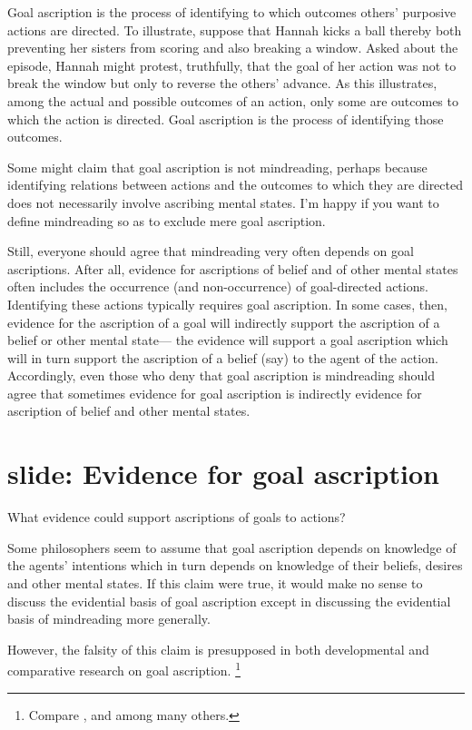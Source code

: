 \documentclass[12pt,\papersize]{extarticle}
\begin{document}
Goal ascription is the process of identifying to which outcomes others' purposive actions are directed.
To illustrate, suppose that
Hannah kicks a ball thereby both preventing her sisters from scoring and also breaking a window.
Asked about the episode,
Hannah might protest, truthfully, that the goal of her action was not to break the window but only to reverse the others' advance.
As this illustrates,
among the actual and possible outcomes of an action,
only some are outcomes to which the action is directed.
Goal ascription is the process of identifying 
 those outcomes.


Some might claim that goal ascription is not mindreading, perhaps because 
identifying relations between actions and the outcomes to which they are directed
does not necessarily involve ascribing mental states.
I'm happy if you want to define mindreading so as to exclude mere goal ascription.

Still, everyone should agree that mindreading very often depends on goal ascriptions. 
After all,
evidence for ascriptions of belief and of other mental states often includes the occurrence (and non-occurrence) of goal-directed actions.
Identifying these actions typically requires goal ascription.
In some cases, then, 
evidence for the ascription of a goal
will indirectly support the ascription of a belief or other mental state---%
the evidence will support  a goal ascription which will in turn support the ascription of a belief (say) to the agent of the action.
Accordingly, even those who deny that goal ascription is mindreading should agree that sometimes evidence for goal ascription is indirectly evidence for ascription of belief and other mental states.



\section{slide: Evidence for goal ascription}
What evidence could support ascriptions of goals to actions?

Some philosophers seem to assume that goal ascription depends on knowledge of the agents' intentions
which in turn depends 
on knowledge of their beliefs, desires and other mental states.
If this claim were true,
it would make no sense to discuss the evidential basis of goal ascription except in discussing the evidential basis of mindreading more generally.

However,
the falsity of this claim  is presupposed  in both developmental and comparative research on goal ascription.%
\footnote{ 
Compare \citet{Gergely:1995sq},
	\citet{Woodward:1998dm} and
	\citet{Penn:2007ey}
among many others.
}
\end{document}
